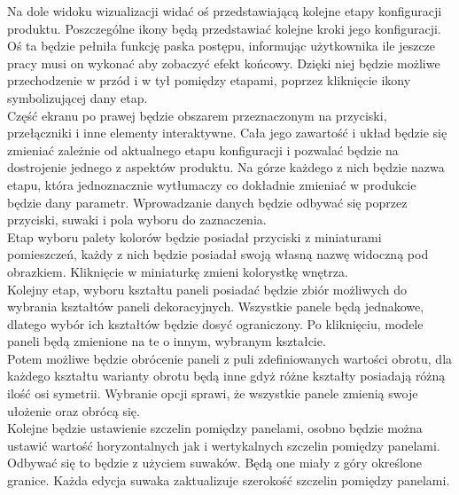 \documentclass{article} %
\begin{document}
        Na dole widoku wizualizacji widać oś przedstawiającą kolejne etapy konfiguracji produktu. Poszczególne ikony będą przedstawiać kolejne kroki jego konfiguracji. Oś ta będzie pełniła funkcję paska postępu, informując użytkownika ile jeszcze pracy musi on wykonać aby zobaczyć efekt końcowy. Dzięki niej będzie możliwe przechodzenie w przód i w tył pomiędzy etapami, poprzez kliknięcie ikony symbolizującej dany etap.
        \\
        
        Część ekranu po prawej będzie obszarem przeznaczonym na przyciski, przełączniki i inne elementy interaktywne. Cała jego zawartość i układ będzie się zmieniać zależnie od aktualnego etapu konfiguracji i pozwalać będzie na dostrojenie jednego z aspektów produktu. Na górze każdego z nich będzie nazwa etapu, która jednoznacznie wytłumaczy co dokładnie zmieniać w produkcie będzie dany parametr. Wprowadzanie danych będzie odbywać się poprzez przyciski, suwaki i pola wyboru do zaznaczenia.
        \\
        
        Etap wyboru palety kolorów będzie posiadał przyciski z miniaturami pomieszczeń, każdy z nich będzie posiadał swoją własną nazwę widoczną pod obrazkiem. Kliknięcie w miniaturkę zmieni kolorystkę wnętrza. 
        \\
        
        Kolejny etap, wyboru kształtu paneli posiadać będzie zbiór możliwych do wybrania kształtów paneli dekoracyjnych. Wszystkie panele będą jednakowe, dlatego wybór ich kształtów będzie dosyć ograniczony. Po kliknięciu, modele paneli będą zmienione na te o innym, wybranym kształcie.
        \\
        
        Potem możliwe będzie obrócenie paneli z puli zdefiniowanych wartości obrotu, dla każdego kształtu warianty obrotu będą inne gdyż różne kształty posiadają różną ilość osi symetrii. Wybranie opcji sprawi, że wszystkie panele zmienią swoje ułożenie oraz obrócą się.
        \\
        
        Kolejne będzie ustawienie szczelin pomiędzy panelami, osobno będzie można ustawić wartość horyzontalnych jak i wertykalnych szczelin pomiędzy panelami. Odbywać się to będzie z użyciem suwaków. Będą one miały z góry określone granice. Każda edycja suwaka zaktualizuje szerokość szczelin pomiędzy panelami.
        \\
        
\end{document}

